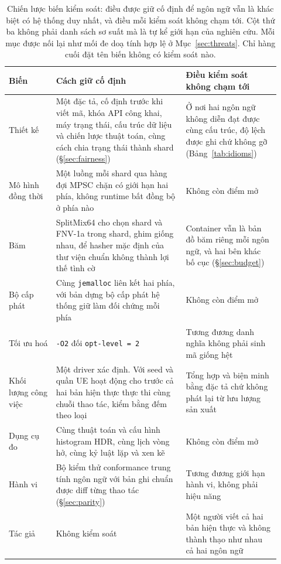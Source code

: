 \begin{table}[H]
\centering
\small
\caption[Chiến lược biến kiểm soát]{Chiến lược biến kiểm soát: điều được giữ cố định để ngôn ngữ vẫn là khác biệt có hệ thống
duy nhất, và điều mỗi kiểm soát không chạm tới. Cột thứ ba không phải danh sách sơ suất mà là
tự kể giới hạn của nghiên cứu. Mỗi mục được nối lại như mối đe doạ tính hợp lệ ở
Mục~\ref{sec:threats}. Chỉ hàng cuối đặt tên biến không có kiểm soát nào.\label{tab:controls}}
\footnotesize
\renewcommand{\arraystretch}{1.15}
\begin{tabular}{@{}R{0.16\linewidth} R{0.44\linewidth} R{0.32\linewidth}@{}}
\hline\hline
Biến & Cách giữ cố định & Điều kiểm soát không chạm tới \\
\hline
Thiết kế & Một đặc tả, cố định trước khi viết mã, khóa API công khai, máy trạng thái, cấu trúc dữ liệu và chiến lược thuật toán, cùng cách chia trạng thái thành shard (\S\ref{sec:fairness}) & Ở nơi hai ngôn ngữ không diễn đạt được cùng cấu trúc, độ lệch được ghi chứ không gỡ (Bảng~\ref{tab:idioms}) \\
Mô hình đồng thời & Một luồng mỗi shard qua hàng đợi MPSC chặn có giới hạn hai phía, không runtime bất đồng bộ ở phía nào & Không còn điểm mở \\
Băm & SplitMix64 cho chọn shard và FNV-1a trong shard, ghim giống nhau, để hasher mặc định của thư viện chuẩn không thành lợi thế tình cờ & Container vẫn là bản đồ băm riêng mỗi ngôn ngữ, và hai bên khác bố cục (\S\ref{sec:budget}) \\
Bộ cấp phát & Cùng \texttt{jemalloc} liên kết hai phía, với bản dựng bộ cấp phát hệ thống giữ làm đối chứng mỗi phía & Không còn điểm mở \\
Tối ưu hoá & \texttt{-O2} đối \texttt{opt-level~=~2} & Tương đương danh nghĩa không phải sinh mã giống hệt \\
Khối lượng công việc & Một driver xác định. Với seed và quần UE hoạt động cho trước cả hai bản hiện thực thực thi cùng chuỗi thao tác, kiểm bằng đếm theo loại & Tổng hợp và biện minh bằng đặc tả chứ không phát lại từ lưu lượng sản xuất \\
Dụng cụ đo & Cùng thuật toán và cấu hình histogram HDR, cùng lịch vòng hở, cùng kỷ luật lặp và xen kẽ & Không còn điểm mở \\
Hành vi & Bộ kiểm thử conformance trung tính ngôn ngữ với bản ghi chuẩn được diff từng thao tác (\S\ref{sec:parity}) & Tương đương giới hạn hành vi, không phải hiệu năng \\
\hline
Tác giả & Không kiểm soát & Một người viết cả hai bản hiện thực và không thành thạo như nhau cả hai ngôn ngữ \\
\hline
\end{tabular}
\end{table}

